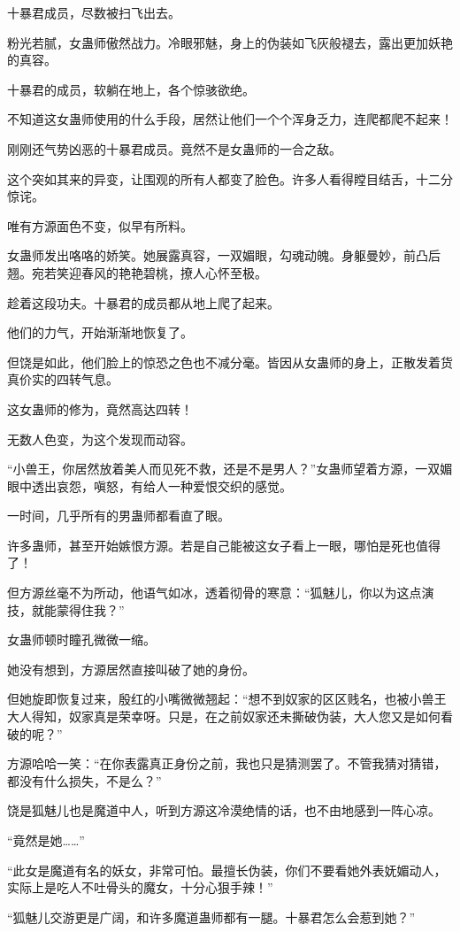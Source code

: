 \begin{this_body}
十暴君成员，尽数被扫飞出去。

粉光若腻，女蛊师傲然战力。冷眼邪魅，身上的伪装如飞灰般褪去，露出更加妖艳的真容。

十暴君的成员，软躺在地上，各个惊骇欲绝。

不知道这女蛊师使用的什么手段，居然让他们一个个浑身乏力，连爬都爬不起来！

刚刚还气势凶恶的十暴君成员。竟然不是女蛊师的一合之敌。

这个突如其来的异变，让围观的所有人都变了脸色。许多人看得瞠目结舌，十二分惊诧。

唯有方源面色不变，似早有所料。

女蛊师发出咯咯的娇笑。她展露真容，一双媚眼，勾魂动魄。身躯曼妙，前凸后翘。宛若笑迎春风的艳艳碧桃，撩人心怀至极。

趁着这段功夫。十暴君的成员都从地上爬了起来。

他们的力气，开始渐渐地恢复了。

但饶是如此，他们脸上的惊恐之色也不减分毫。皆因从女蛊师的身上，正散发着货真价实的四转气息。

这女蛊师的修为，竟然高达四转！

无数人色变，为这个发现而动容。

“小兽王，你居然放着美人而见死不救，还是不是男人？”女蛊师望着方源，一双媚眼中透出哀怨，嗔怒，有给人一种爱恨交织的感觉。

一时间，几乎所有的男蛊师都看直了眼。

许多蛊师，甚至开始嫉恨方源。若是自己能被这女子看上一眼，哪怕是死也值得了！

但方源丝毫不为所动，他语气如冰，透着彻骨的寒意：“狐魅儿，你以为这点演技，就能蒙得住我？”

女蛊师顿时瞳孔微微一缩。

她没有想到，方源居然直接叫破了她的身份。

但她旋即恢复过来，殷红的小嘴微微翘起：“想不到奴家的区区贱名，也被小兽王大人得知，奴家真是荣幸呀。只是，在之前奴家还未撕破伪装，大人您又是如何看破的呢？”

方源哈哈一笑：“在你表露真正身份之前，我也只是猜测罢了。不管我猜对猜错，都没有什么损失，不是么？”

饶是狐魅儿也是魔道中人，听到方源这冷漠绝情的话，也不由地感到一阵心凉。

“竟然是她……”

“此女是魔道有名的妖女，非常可怕。最擅长伪装，你们不要看她外表妩媚动人，实际上是吃人不吐骨头的魔女，十分心狠手辣！”

“狐魅儿交游更是广阔，和许多魔道蛊师都有一腿。十暴君怎么会惹到她？”


\end{this_body}
